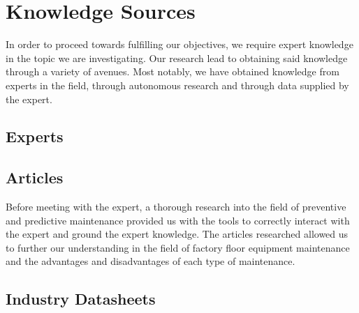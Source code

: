\section{Knowledge Sources}

In order to proceed towards fulfilling our objectives, we require expert knowledge in the topic we are investigating. Our research lead to obtaining said knowledge through a variety of avenues. Most notably, we have obtained knowledge from experts in the field, through autonomous research and through data supplied by the expert.

\subsection{Experts}



\subsection{Articles}

Before meeting with the expert, a thorough research into the field of preventive and predictive maintenance provided us with the tools to correctly interact with the expert and ground the expert knowledge. The articles researched allowed us to further our understanding in the field of factory floor equipment maintenance and the advantages and disadvantages of each type of maintenance.

\subsection{Industry Datasheets}

